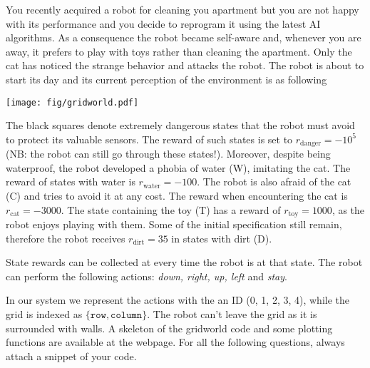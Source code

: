 
\newif\ifvimbug
\vimbugfalse

\ifvimbug

\fi


You recently acquired a robot for cleaning you apartment but you are not happy with its performance and you decide to reprogram it using the latest AI algorithms. As a consequence the robot became self-aware and, whenever you are away, it prefers to play with toys rather than cleaning the apartment. Only the cat has noticed the strange behavior and attacks the robot. The robot is about to start its day and its current perception of the environment is as following 
%
\begin{center}
	\texttt{[image: fig/gridworld.pdf]}
\end{center}
%
The black squares denote extremely dangerous states that the robot must avoid to protect its valuable sensors. The reward of such states is set to $r_\textrm{danger}=-10^5$ (NB: the robot can still go through these states!). Moreover, despite being waterproof, the robot developed a phobia of water (W), imitating the cat. The reward of states with water is $r_\textrm{water}=-100$. The robot is also afraid of the cat (C) and tries to avoid it at any cost. The reward when encountering the cat is $r_\textrm{cat}=-3000$. The state containing the toy (T) has a reward of $r_\textrm{toy}=1000$, as the robot enjoys playing with them. Some of the initial specification still remain, therefore the robot receives $r_\textrm{dirt}=35$ in states with dirt (D).

State rewards can be collected at every time the robot is at that state. 
The robot can perform the following actions: \textit{down, right, up, left} and
\textit{stay}.

In our system we represent the actions with the an ID (0, 1, 2, 3, 4), while the grid is indexed as $\{ \texttt{row}, \texttt{column} \}$. The robot can't leave the grid as it is surrounded with walls.
A skeleton of the gridworld code and some plotting functions are available at the webpage.
For all the following questions, always attach a snippet of your code.



